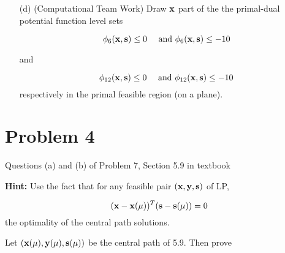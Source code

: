\documentclass{article} %
\newcommand\x{{\bf x}}
\newcommand\y{{\bf y}}
\newcommand\s{{\bf s}}
\begin{document}
\begin{itemize}
\item[(d)] (Computational Team Work) Draw $\x$ part of the the primal-dual potential function level sets 

\[
\phi_6(\x, \s) \leq 0 \quad \mbox{ and } \phi_6(\x,\s) \leq -10 
\]

and 


\[
\phi_{12}(\x, \s) \leq 0 \quad \mbox{ and } \phi_{12}(\x,\s) \leq -10 
\]
respectively in the primal feasible region (on a plane).

\end{itemize}


\section*{ Problem 4}
Questions (a) and (b) of Problem 7, Section 5.9 in textbook 

\textbf{Hint:} Use the fact that for any feasible pair $(\x,\y,\s)
$ of LP, 

\[
(\x - \x(\mu))^{T}(\s - \s(\mu)) = 0
\]
the optimality of the central path solutions. 


Let $(\x(\mu), \y( \mu), \s(\mu))$ be the central path of 5.9. Then prove 
\end{document}

